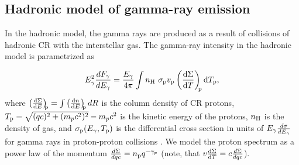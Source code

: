 

\subsection{Hadronic model of gamma-ray emission}
\label{sec:Pion_model}

In the hadronic model, the gamma rays are produced as a result of collisions of hadronic CR with the interstellar gas.
The gamma-ray intensity in the hadronic model is parametrized as

\begin{equation}
E^2_\gamma \frac{dF_\gamma}{dE_\gamma} = \frac{E_\gamma}{4\pi} \int n_{\text{H}}\ \sigma_{\text{p}} v_{\text{p}} \left(\frac{\text{d} \Sigma}{\text{d} T}\right)_{\!\!\text{p}} \text{d} T_{\text{p}},
\end{equation}
where $\left(\frac{\text{d} \Sigma}{\text{d} E}\right)_{\!\!\text{p}} = \int \left(\frac{\text{d} n}{\text{d} E}\right)_{\!\!\text{p}} dR$ is the column density 
of CR protons,
$T_{\text{p}} = \sqrt{(q c)^2 + (m_p c^2)^2} - m_p c^2$ is the kinetic energy of the protons,
$n_{\text{H}}$ is the density of gas, and $\sigma_{\text{p}} (E_\gamma, T_{\text{p}})$ is 
the differential cross section in units of $E_\gamma\frac{d\sigma}{d E_\gamma}$
for gamma rays in proton-proton collisions \citep{2006ApJ...647..692K, 2008ApJ...674..278K}.
We model the proton spectrum as a power law of the momentum $\frac{d \Sigma}{d qc} = n_{\text{p}} q^{-\gamma_p}$ 
(note, that $ v \frac{\text{d} \Sigma}{\text{d} T} = c \frac{d \Sigma}{d qc}$).


